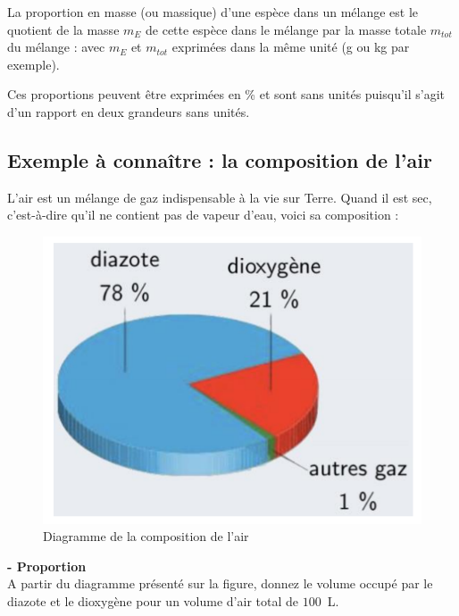 \begin{tcolorbox}[colback=green!5!white,colframe=green!75!black,title=\textbf{Proportion massique}]
La proportion en masse (ou massique) d'une espèce dans un mélange est le quotient de la masse $m_{E}$ de cette espèce dans le mélange par la masse totale $m_{tot}$ du mélange :
\newline
\newline
\newline
\newline
avec $m_{E}$ et $m_{tot}$ exprimées dans la même unité (g ou kg par exemple).
\end{tcolorbox}

Ces proportions peuvent être exprimées en \% et sont sans unités puisqu'il s'agit d'un rapport en deux grandeurs sans unités.

\subsection{Exemple à connaître : la composition de l'air}
L'air est un mélange de gaz indispensable à la vie sur Terre. Quand il est sec, c'est-à-dire qu'il ne contient pas de vapeur d'eau, voici sa composition :
\begin{figure}[!hbt]
    \centering
    \includegraphics[scale=1]{Images/Composition_air.png}
    \caption{Diagramme de la composition de l'air}
    \label{fig:compo_air}
\end{figure}

\begin{mdframed}[style=autreexo]
\textbf{ - Proportion}\\
A partir du diagramme présenté sur la figure, donnez le volume occupé par le diazote et le dioxygène pour un volume d'air total de $100$~L.
\end{mdframed}
